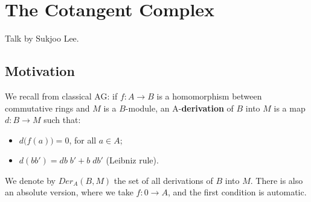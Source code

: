 \documentclass[10pt,a4paper,reqno,oneside]{book} %
\theoremstyle{plain}
\newtheorem{thm}{Theorem}[section]
\theoremstyle{definition}
\theoremstyle{remark}
\numberwithin{equation}{section}
\begin{document}








\chapter{The Cotangent Complex}
Talk by Sukjoo Lee.

\section{Motivation}
\label{sect:cc_motivation}

We recall from classical AG: if $f:A \to B$ is a homomorphism between commutative rings and $M$ is a $B$-module, 
an A-\textbf{derivation} of $B$ into $M$ is a map $d : B \to M$ such that:
\begin{itemize}
\item $d\big( f(a)\big) = 0$, for all $a\in A$;
\item $d(bb') = db\; b' + b\; db'$ (Leibniz rule).
\end{itemize}
We denote by $Der_A(B,M)$ the set of all derivations of $B$ into $M$. There is also an absolute version, where
we take $f:0 \to A$, and the first condition is automatic.
\end{document}
